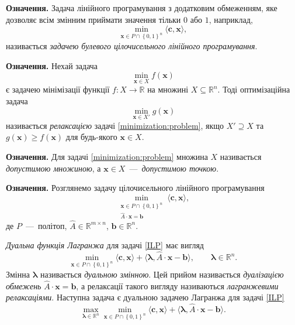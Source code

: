 \textbf{Означення.}
Задача лінійного програмування з додатковим обмеженням,
яке дозволяє всім змінним приймати значення тільки $0$ або $1$,
наприклад,
\begin{equation*}
    \min \limits_{\pmb{x} \in P \cap \left\{ 0, 1 \right\}^n}
    \langle \pmb{c}, \pmb{x} \rangle,
\end{equation*}
називається \textit{задачею булевого цілочисельного лінійного програмування}.

\textbf{Означення.}
Нехай задача
\begin{equation} \label{minimization:problem}
    \min_{\pmb{x} \in X} f \left( \pmb{x} \right)
\end{equation}
є задачею мінімізації функції $f: X \to \mathbb{R}$ на множині
$X \subseteq \mathbb{R}^n$.
Тоді оптимізаційна задача
\begin{equation*}
    \min_{\pmb{x} \in X'} g \left(\pmb{x} \right)
\end{equation*}
називається \textit{релаксацією} задачі \eqref{minimization:problem},
якщо $X' \supseteq X$ та $g \left( \pmb{x} \right) \ge f \left( \pmb{x} \right)$
для будь-якого $\pmb{x} \in X$.

\textbf{Означення.}
Для задачі \eqref{minimization:problem} множина $X$ називається
\textit{допустимою множиною}, а $\pmb{x} \in X$~---~\textit{допустимою точкою}.

\textbf{Означення.}
Розглянемо задачу цілочисельного лінійного програмування
\begin{equation} \label{ILP}
    \min \limits_{\substack{\pmb{x} \in P \cap \left\{ 0, 1\right\}^n \\
                  \hat{A} \cdot \pmb{x} = \pmb{b}}}
        \langle \pmb{c}, \pmb{x} \rangle,
\end{equation}
де $P$~---~політоп, $\hat{A} \in \mathbb{R}^{m \times n}$,
$\pmb{b} \in \mathbb{R}^n$.

\textit{Дуальна функція Лагранжа} для задачі \eqref{ILP} має вигляд
\begin{equation} \label{dualization}
    \min \limits_{\pmb{x} \in P \cap \left\{ 0, 1 \right\}^n}
        \langle \pmb{c}, \pmb{x} \rangle +
        \langle \pmb{\lambda}, \hat{A} \cdot \pmb{x} - \pmb{b} \rangle, \qquad
    \pmb{\lambda} \in \mathbb{R}^n.
\end{equation}
Змінна $\pmb{\lambda}$ називається \textit{дуальною змінною}.
Цей прийом називається \textit{дуалізацією обмежень}
$\hat{A} \cdot \pmb{x} = \pmb{b}$,
а релаксації такого вигляду називаються \textit{лагранжевими релаксаціями}.
Наступна задача є дуальною задачею Лагранжа для задачі \eqref{ILP}
\begin{equation} \label{lagrange:dual:problem}
    \max \limits_{\pmb{\lambda} \in \mathbb{R}^n}
        \min \limits_{\pmb{x} \in P \cap \left\{ 0, 1 \right\}^n}
            \langle \pmb{c}, \pmb{x} \rangle +
            \langle \pmb{\lambda}, \hat{A} \cdot \pmb{x} - \pmb{b} \rangle.
\end{equation}

